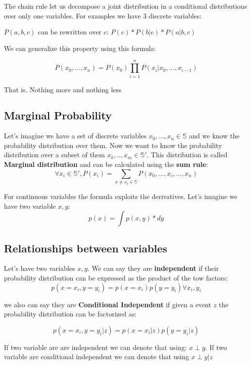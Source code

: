 The chain rule let us decompose a joint distribution in a conditional distributions over only one variables.
For examples we have 3 discrete variables:

$P(a,b,c) $ can be rewritten over $c$: $P(c) * P(b|c) * P(a | b,c)$

We can generalize this property using this formula:

\begin{equation}
P(x_0, ..., x_n) = P(x_0) \prod_{i = 1}^n P(x_i | x_0, ... , x_{i-1})
\end{equation}

That is. Nothing more and nothing less

\subsection{Marginal Probability}

Let's imagine we have a set of discrete variables $x_0, ... , x_n \in \mathbb{S}$ and we know the probability distribution over them. Now we want to know the probability distribution over a subset of them $x_k, .. , x_m \in \mathbb{S}'$. This distribution is called \textbf{Marginal distribution} and can be calculated using the \textbf{sum rule}:
\begin{equation}
\forall x_i \in \mathbb{S}', P(x_i) = \sum_{x \neq x_i \in \mathbb{S}} P(x_0, ... , x_i, ..., x_n)
\end{equation}

For continuous variables the formula exploits the derivatives. Let's imagine we have two variable $x,y$:
\begin{equation}
p(x) = \int p(x, y)*dy
\end{equation}

\subsection{Relationships between variables}
Let's have two variables $x,y$. We can say they are \textbf{independent} if  their probability distribution can be expressed as the product of the tow factors:
\begin{equation}
 p(x = x_i, y = y_i) = p(x = x_i)p(y=y_i) \forall x_i, y_i 
 \end{equation} 
 
 we also can say they are \textbf{Conditional Independent} if  given a event $z$ the probability distribution can be factorized as:
 
 \begin{equation}
 p(x = x_i, y = y_i | z ) = p(x=x_i | z) p(y=y_i | z)
 \end{equation}
 
 If two variable are are independent we can denote that using: $x \perp y$. \linebreak
 If two variable are conditional independent we can denote that using   $x \perp y | z$